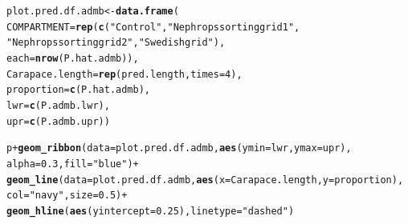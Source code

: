 \documentclass[12pt]{article}\usepackage[]{graphicx}\usepackage[]{color}
\makeatletter
\newcommand{\hlnum}[1]{\textcolor[rgb]{0.686,0.059,0.569}{#1}}%
\newcommand{\hlstr}[1]{\textcolor[rgb]{0.192,0.494,0.8}{#1}}%
\newcommand{\hlopt}[1]{\textcolor[rgb]{0,0,0}{#1}}%
\newcommand{\hlstd}[1]{\textcolor[rgb]{0.345,0.345,0.345}{#1}}%
\newcommand{\hlkwb}[1]{\textcolor[rgb]{0.69,0.353,0.396}{#1}}%
\newcommand{\hlkwc}[1]{\textcolor[rgb]{0.333,0.667,0.333}{#1}}%
\newcommand{\hlkwd}[1]{\textcolor[rgb]{0.737,0.353,0.396}{\textbf{#1}}}%
\newenvironment{kframe}{%
 \def\at@end@of@kframe{}%
 \ifinner\ifhmode%
  \def\at@end@of@kframe{\end{minipage}}%
  \begin{minipage}{\columnwidth}%
 \fi\fi%
 \def\FrameCommand##1{\hskip\@totalleftmargin \hskip-\fboxsep
 \colorbox{shadecolor}{##1}\hskip-\fboxsep
     \hskip-\linewidth \hskip-\@totalleftmargin \hskip\columnwidth}%
 \MakeFramed {\advance\hsize-\width
   \@totalleftmargin\z@ \linewidth\hsize
   \@setminipage}}%
 {\par\unskip\endMakeFramed%
 \at@end@of@kframe}
\newenvironment{knitrout}{}{} %
\makeatother
\begin{document}
\begin{knitrout}
\begin{kframe}
\begin{alltt}
\hlstd{plot.pred.df.admb} \hlkwb{<-} \hlkwd{data.frame}\hlstd{(}
                       \hlkwc{COMPARTMENT} \hlstd{=} \hlkwd{rep}\hlstd{(}\hlkwd{c}\hlstd{(}\hlstr{"Control"}\hlstd{,} \hlstr{"Nephrops sorting grid 1"}\hlstd{,}
                           \hlstr{"Nephrops sorting grid 2"}\hlstd{,} \hlstr{"Swedish grid"}\hlstd{),}
                         \hlkwc{each} \hlstd{=} \hlkwd{nrow}\hlstd{(P.hat.admb)),}
                       \hlkwc{Carapace.length} \hlstd{=} \hlkwd{rep}\hlstd{(pred.length,} \hlkwc{times} \hlstd{=} \hlnum{4}\hlstd{),}
                       \hlkwc{proportion} \hlstd{=} \hlkwd{c}\hlstd{(P.hat.admb),}
                       \hlkwc{lwr} \hlstd{=} \hlkwd{c}\hlstd{(P.admb.lwr),}
                       \hlkwc{upr} \hlstd{=} \hlkwd{c}\hlstd{(P.admb.upr))}

\hlstd{p} \hlopt{+} \hlkwd{geom_ribbon}\hlstd{(}\hlkwc{data} \hlstd{= plot.pred.df.admb,} \hlkwd{aes}\hlstd{(}\hlkwc{ymin} \hlstd{= lwr,} \hlkwc{ymax} \hlstd{= upr),}
                \hlkwc{alpha} \hlstd{=} \hlnum{0.3}\hlstd{,} \hlkwc{fill} \hlstd{=} \hlstr{"blue"}\hlstd{)} \hlopt{+}
  \hlkwd{geom_line}\hlstd{(}\hlkwc{data} \hlstd{= plot.pred.df.admb,} \hlkwd{aes}\hlstd{(}\hlkwc{x} \hlstd{= Carapace.length,} \hlkwc{y} \hlstd{= proportion),}
            \hlkwc{col} \hlstd{=} \hlstr{"navy"}\hlstd{,} \hlkwc{size} \hlstd{=} \hlnum{0.5}\hlstd{)} \hlopt{+}
  \hlkwd{geom_hline}\hlstd{(}\hlkwd{aes}\hlstd{(}\hlkwc{yintercept} \hlstd{=} \hlnum{0.25}\hlstd{),} \hlkwc{linetype} \hlstd{=} \hlstr{"dashed"}\hlstd{)}
\end{alltt}
\end{kframe}\begin{figure}

\end{figure}
\end{knitrout}
\end{document}
